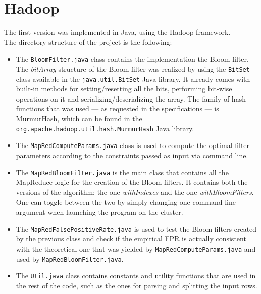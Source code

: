 %       
%
\chapter{Hadoop}\label{ch:hadoop}
The first version was implemented in Java, using the Hadoop framework.\\
The directory structure of the project is the following:\\
\hfill \break
\begin{itemize}
\item The \texttt{BloomFilter.java} class contains the implementation the Bloom filter.\\
The \textit{bitArray} structure of the Bloom filter was realized by using the \texttt{BitSet} class available in the \texttt{java.util.BitSet} Java library. It already comes with built-in methods for setting/resetting all the bits, performing bit-wise operations on it and serializing/deserializing the array.
The family of hash functions that was used --- as requested in the specifications --- is MurmurHash, which can be found in the \texttt{org.apache.hadoop.util.hash.MurmurHash} Java library.\\
\item The \texttt{MapRedComputeParams.java} class is used to compute the optimal filter parameters according to the constraints passed as input via command line.\\
\item The \texttt{MapRedBloomFilter.java} is the main class that contains all the MapReduce logic for the creation of the Bloom filters. It contains both the versions of the algorithm: the one \textit{withIndexes} and the one \textit{withBloomFilters}. One can toggle between the two by simply changing one command line argument when launching the program on the cluster.\\
\item The \texttt{MapRedFalsePositiveRate.java} is used to test the Bloom filters created by the previous class and check if the empirical FPR is actually consistent with the theoretical one that was yielded by \texttt{MapRedComputeParams.java} and used by \texttt{MapRedBloomFilter.java}.\\
\item The \texttt{Util.java} class contains constants and utility functions that are used in the rest of the code, such as the ones for parsing and splitting the input rows.\\
\end{itemize}

